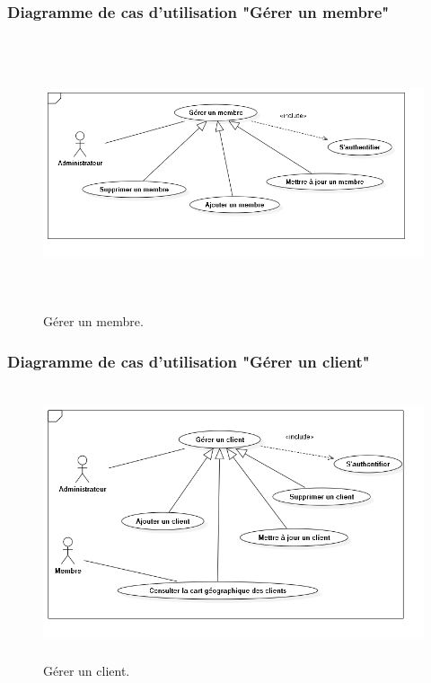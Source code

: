 \subsubsection{ Diagramme de cas d'utilisation "G\'{e}rer un membre"}
\begin{figure}[H]
\center
\includegraphics[width=13cm,height=8cm]{./figures/ucM.png}
\caption{G\'{e}rer un membre.}

\end{figure}


\subsubsection{ Diagramme de cas d'utilisation "G\'{e}rer un client"}
\begin{figure}[H]
\center
\includegraphics[width=13cm,height=8cm]{./figures/ucC.png}
\caption{G\'{e}rer un client.}
\end{figure}

